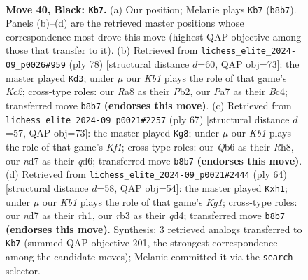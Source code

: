 \documentclass[11pt]{article}
\begin{document}
\clearpage

\begin{figure}[p]\centering
\begin{subfigure}{0.46\textwidth}\centering
\resizebox{\linewidth}{!}{%
\newchessgame
\chessboard[
  setfen={rk4r1/p2N1p1p/1qp5/5Q2/3P4/1R4PP/5P2/6K1 b - - 2 40},
  showmover=false,
  pgfstyle=straightmove, color=movearrow, markmove={b8-b7}
]}
\caption{}
\end{subfigure}\hfill
\begin{subfigure}{0.46\textwidth}\centering
\resizebox{\linewidth}{!}{%
\newchessgame
\chessboard[
  setfen={1k6/1p6/p4q2/5Pp1/2BnQ1P1/8/PPK1R3/7r w - - 1 40},
  showmover=false,
  pgfstyle=straightmove, color=movearrow, markmove={c2-d3}
]}
\caption{}
\end{subfigure}
\\[4pt]
\begin{subfigure}{0.46\textwidth}\centering
\resizebox{\linewidth}{!}{%
\newchessgame
\chessboard[
  setfen={4rk1r/5p1p/3Q4/pPP1N3/3Pp2p/8/3q2P1/5RK1 b - - 1 34},
  showmover=false,
  pgfstyle=straightmove, color=movearrow, markmove={f8-g8}
]}
\caption{}
\end{subfigure}\hfill
\begin{subfigure}{0.46\textwidth}\centering
\resizebox{\linewidth}{!}{%
\newchessgame
\chessboard[
  setfen={4k3/p4p1p/1n6/2p1P1P1/3q4/P7/5QP1/4R1Kr w - - 3 33},
  showmover=false,
  pgfstyle=straightmove, color=movearrow, markmove={g1-h1}
]}
\caption{}
\end{subfigure}
\caption{\textbf{Move 40, Black: \texttt{Kb7}.} (a) Our position; Melanie plays \texttt{Kb7} (\texttt{b8b7}). Panels (b)--(d) are the retrieved master positions whose correspondence most drove this move (highest QAP objective among those that transfer to it). (b) Retrieved from \texttt{lichess\_elite\_2024-09\_p0026\#959} (ply 78) [structural distance $d$=60, QAP obj=73]: the master played \texttt{Kd3}; under $\mu$ our \emph{Kb1} plays the role of that game's \emph{Kc2}; cross-type roles: our \emph{R}a8 as their \emph{P}b2, our \emph{P}a7 as their \emph{B}c4; transferred move \texttt{b8b7} \textbf{(endorses this move)}. (c) Retrieved from \texttt{lichess\_elite\_2024-09\_p0021\#2257} (ply 67) [structural distance $d$=57, QAP obj=73]: the master played \texttt{Kg8}; under $\mu$ our \emph{Kb1} plays the role of that game's \emph{Kf1}; cross-type roles: our \emph{Q}b6 as their \emph{R}h8, our \emph{n}d7 as their \emph{q}d6; transferred move \texttt{b8b7} \textbf{(endorses this move)}. (d) Retrieved from \texttt{lichess\_elite\_2024-09\_p0021\#2444} (ply 64) [structural distance $d$=58, QAP obj=54]: the master played \texttt{Kxh1}; under $\mu$ our \emph{Kb1} plays the role of that game's \emph{Kg1}; cross-type roles: our \emph{n}d7 as their \emph{r}h1, our \emph{r}b3 as their \emph{q}d4; transferred move \texttt{b8b7} \textbf{(endorses this move)}. Synthesis: 3 retrieved analogs transferred to \texttt{Kb7} (summed QAP objective 201, the strongest correspondence among the candidate moves); Melanie committed it via the \texttt{search} selector.}
\label{fig:thought-m79}
\end{figure}
\end{document}
